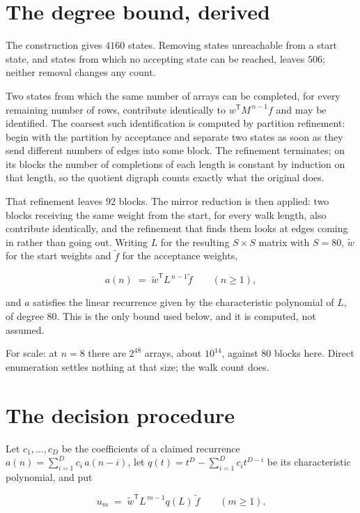 \documentclass[11pt]{article}
\theoremstyle{definition}
\begin{document}
\section{The degree bound, derived}

The construction gives $4160$ states. Removing states unreachable from a start state, and states from which no accepting state can be reached, leaves $506$; neither removal changes any count.

Two states from which the same number of arrays can be completed, for every remaining number of rows, contribute identically to $w^{\mathsf T}M^{\,n-1}f$ and may be identified. The coarsest such identification is computed by partition refinement: begin with the partition by acceptance and separate two states as soon as they send different numbers of edges into some block. The refinement terminates; on its blocks the number of completions of each length is constant by induction on that length, so the quotient digraph counts exactly what the original does.

That refinement leaves $92$ blocks. The mirror reduction is then applied: two blocks receiving the same weight from the start, for every walk length, also contribute identically, and the refinement that finds them looks at edges coming in rather than going out. Writing $L$ for the resulting $S \times S$ matrix with $S = 80$, $\tilde w$ for the start weights and $\tilde f$ for the acceptance weights,

\[a(n) \;=\; \tilde w^{\mathsf T} L^{\,n-1} \tilde f \qquad (n \ge 1),\]

and $a$ satisfies the linear recurrence given by the characteristic polynomial of $L$, of degree $80$. This is the only bound used below, and it is computed, not assumed.

For scale: at $n = 8$ there are $2^{48}$ arrays, about $10^{14}$, against $80$ blocks here. Direct enumeration settles nothing at that size; the walk count does.

\section{The decision procedure}

Let $c_1,\dots,c_D$ be the coefficients of a claimed recurrence $a(n) = \sum_{i=1}^{D} c_i\,a(n-i)$, let $q(t) = t^{D} - \sum_{i=1}^{D} c_i t^{D-i}$ be its characteristic polynomial, and put

\[u_m \;=\; \tilde w^{\mathsf T} L^{\,m-1} q(L)\,\tilde f \qquad (m \ge 1).\]
\end{document}

